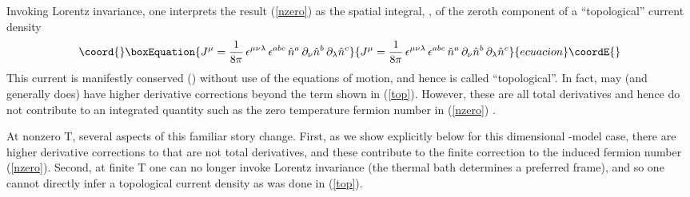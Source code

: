 \documentclass[a4paper,prd]{revtex4}
\begin{document}
Invoking Lorentz invariance, one interprets the result (\ref{nzero}) as the spatial
integral, \coordHE{}, of the zeroth component \coordHE{} of a ``topological''
current density
\begin{equation}\coord{}\boxEquation{
J^{\mu}=\frac{1}{8\pi}\,\epsilon^{\mu\nu\lambda}\, \epsilon^{abc}\, \hat{n}^{a}\,  
\partial_{\nu}\hat{n}^{b}\, \partial_{\lambda}\hat{n}^{c}
\label{top}
}{
J^{\mu}=\frac{1}{8\pi}\,\epsilon^{\mu\nu\lambda}\, \epsilon^{abc}\, \hat{n}^{a}\,  
\partial_{\nu}\hat{n}^{b}\, \partial_{\lambda}\hat{n}^{c}
}{ecuacion}\coordE{}\end{equation}
This current is manifestly conserved (\coordHE{}) without use of the
equations of motion, and hence is called ``topological''. In fact, \coordHE{} may (and
generally does) have higher derivative corrections beyond the term shown in
(\ref{top}). However, these are all total derivatives and hence do not contribute to
an integrated quantity such as the zero temperature fermion number \coordHE{} in (\ref{nzero}) \cite{wilczek}. 

At nonzero T, several aspects of this familiar story change. First, as
we show explicitly below for this \coordHE{} dimensional \myHighlight{$\sigma$}\coordHE{}-model
case, there are higher derivative corrections to \coordHE{} that are not
total derivatives, and these contribute to the finite \coordHE{} correction
to the \coordHE{} induced fermion number (\ref{nzero}). Second, at finite T
one can no longer invoke Lorentz invariance (the thermal bath
determines a preferred frame), and so one cannot directly infer a
topological current density as was done in (\ref{top}). 
\end{document}
